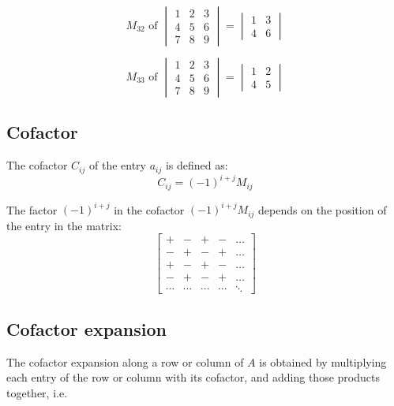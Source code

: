 \documentclass[11pt]{article}
\begin{document}
\begin{displaymath}
M_{32} \text{ of }
\begin{vmatrix}
1 & 2 & 3 \\
4 & 5 & 6 \\
7 & 8 & 9
\end{vmatrix} = \begin{vmatrix}
1 & 3 \\
4 & 6
\end{vmatrix}
\end{displaymath}

\begin{displaymath}
M_{33} \text{ of }
\begin{vmatrix}
1 & 2 & 3 \\
4 & 5 & 6 \\
7 & 8 & 9
\end{vmatrix} = \begin{vmatrix}
1 & 2 \\
4 & 5
\end{vmatrix}
\end{displaymath}

 \newpage

\subsection{Cofactor}
\label{sec:orge4d83d8}
The cofactor \(C_{ij}\) of the entry \(a_{ij}\) is defined as:
\[C_{ij} = (-1)^{i + j} M_{ij}\]

The factor \((-1)^{i + j}\) in the cofactor \((-1)^{i + j} M_{ij}\) depends on the position
of the entry in the matrix:
\begin{displaymath}
\begin{bmatrix}
+ & - & + & - & \ldots \\
- & + & - & + & \ldots \\
+ & - & + & - & \ldots \\
- & + & - & + & \ldots \\
\cdots & \cdots & \cdots & \cdots & \ddots
\end{bmatrix}
\end{displaymath}

\subsection{Cofactor expansion}
\label{sec:org640c07c}
The cofactor expansion along a row or column of \(A\) is obtained by multiplying each entry of the row or column with its cofactor, and adding those products together, i.e.
\\[0pt]
\end{document}
